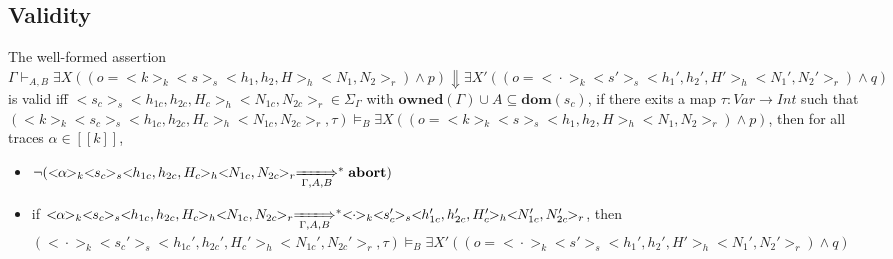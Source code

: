 \documentclass{lmcs} %
\theoremstyle{plain}\newtheorem{satz}[thm]{Satz} %
\begin{document}
\subsection*{Validity}
\begin{defi}
The well-formed assertion
$\Gamma \vdash_{A,B} \exists X((o=<\!\!k\!\!>_k<\!\!s\!\!>_s<\!\!h_1,h_2,H\!\!>_h<\!\!N_1,N_2\!\!>_r)\land p)\Downarrow \exists X'((o=<\!\!\cdot\!\!>_k<\!\!s'\!\!>_s<\!\!h_1',h_2',H'\!\!>_h<\!\!N_1',N_2'\!\!>_r)\land q)$ is valid iff  $<\!\!s_c\!\!>_s<\!\!h_{1c},h_{2c},H_c\!\!>_h<\!\!N_{1c},N_{2c}\!\!>_r\in \Sigma_\Gamma$ with $\mathbf{owned}(\Gamma)\cup A \subseteq \mathbf{dom}(s_c)$, if there exits a map $\tau:\mathit{Var}\to Int$ such that $(<\!\!k\!\!>_k<\!\!s_c\!\!>_s<\!\!h_{1c},h_{2c},H_c\!\!>_h<\!\!N_{1c},N_{2c}\!\!>_r,\tau)\models_B \exists X((o=<\!\!k\!\!>_k<\!\!s\!\!>_s<\!\!h_1,h_2,H\!\!>_h<\!\!N_1,N_2\!\!>_r)\land p)$, then for all traces $\alpha\in [\![k]\!]$,
\begin{itemize}
  \item $\neg(<\!\!\alpha\!\!>_k<\!\!s_c\!\!>_s<\!\!h_{1c},h_{2c},H_c\!\!>_h<\!\!N_{1c},N_{2c}\!\!>_r\xLongrightarrow[\Gamma, A, B]{}^*\mathbf{abort})$
  \item if $<\!\!\alpha\!\!>_k<\!\!s_c\!\!>_s<\!\!h_{1c},h_{2c},H_c\!\!>_h<\!\!N_{1c},N_{2c}\!\!>_r\xLongrightarrow[\Gamma, A, B]{}^*<\!\!\cdot\!\!>_k<\!\!s_c'\!\!>_s<\!\!h_{1c}',h_{2c}',H_c'\!\!>_h<\!\!N_{1c}',N_{2c}'\!\!>_r$, then $(<\!\!\cdot\!\!>_k<\!\!s_c'\!\!>_s<\!\!h_{1c}',h_{2c}',H_c'\!\!>_h<\!\!N_{1c}',N_{2c}'\!\!>_r,\tau)\models_B \exists X'((o=<\!\!\cdot\!\!>_k<\!\!s'\!\!>_s<\!\!h_1',h_2',H'\!\!>_h<\!\!N_1',N_2'\!\!>_r)\land q)$
\end{itemize}
\end{defi}
\end{document}
